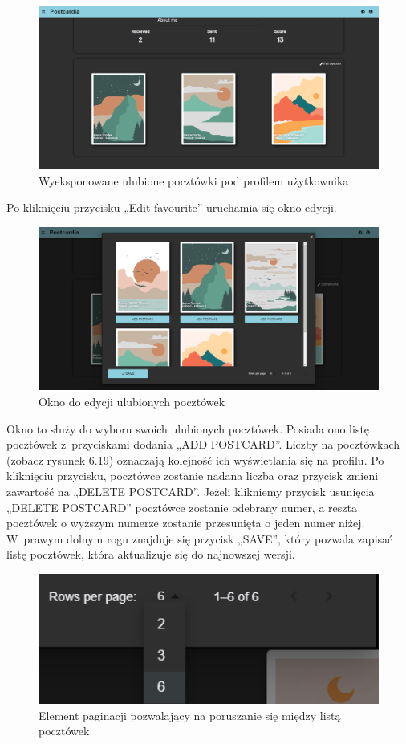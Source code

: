 \documentclass[a4paper,twoside,12pt]{book}
\begin{document}
\begin{figure}[H]
    \centering
    \includegraphics[width=1\textwidth]{webowka_ss/favorite.png}
    \caption{Wyeksponowane ulubione pocztówki pod profilem użytkownika}
\end{figure}
Po kliknięciu przycisku „Edit favourite” uruchamia się okno edycji. 
\begin{figure}[H]
    \centering
    \includegraphics[width=1\textwidth]{webowka_ss/edit_favorite.png}
    \caption{Okno do edycji ulubionych pocztówek}
\end{figure}
Okno to służy do wyboru swoich ulubionych pocztówek. Posiada ono listę pocztówek z~przyciskami dodania „ADD POSTCARD”. Liczby na pocztówkach (zobacz rysunek 6.19) oznaczają kolejność ich wyświetlania się na profilu. Po kliknięciu przycisku, pocztówce zostanie nadana liczba oraz przycisk zmieni zawartość na „DELETE POSTCARD”. Jeżeli klikniemy przycisk usunięcia „DELETE POSTCARD” pocztówce zostanie odebrany numer, a reszta pocztówek o wyższym numerze zostanie przesunięta o jeden numer niżej. W~prawym dolnym rogu znajduje się przycisk „SAVE”, który pozwala zapisać listę pocztówek, która aktualizuje się do najnowszej wersji. 
\begin{figure}[H]
    \centering
    \includegraphics[width=1\textwidth]{webowka_ss/pagination.png}
    \caption{Element paginacji pozwalający na poruszanie się między listą pocztówek}
\end{figure}
\end{document}
